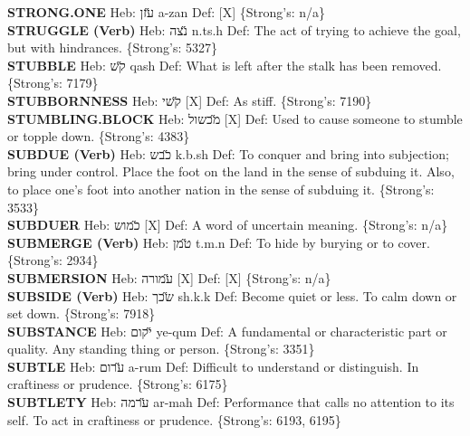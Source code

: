 {\textbf{STRONG.ONE} Heb: {\large\H עזן} a-zan Def: {[}X{]} \{Strong's: n/a\}\hfill{}\\

\textbf{STRUGGLE (Verb)} Heb: {\large\H נצה} n.ts.h Def: The act of trying to achieve the goal, but with hindrances. \{Strong's: 5327\}\hfill{}\\

\textbf{STUBBLE} Heb: {\large\H קש} qash Def: What is left after the stalk has been removed. \{Strong's: 7179\}\hfill{}\\

\textbf{STUBBORNNESS} Heb: {\large\H קשי} {[}X{]} Def: As stiff. \{Strong's: 7190\}\hfill{}\\

\textbf{STUMBLING.BLOCK} Heb: {\large\H מכשול} {[}X{]} Def: Used to cause someone to stumble or topple down. \{Strong's: 4383\}\hfill{}\\

\textbf{SUBDUE (Verb)} Heb: {\large\H כבש} k.b.sh Def: To conquer and bring into subjection; bring under control. Place the foot on the land in the sense of subduing it. Also, to place one’s foot into another nation in the sense of subduing it. \{Strong's: 3533\}\hfill{}\\

\textbf{SUBDUER} Heb: {\large\H כמוש} {[}X{]} Def: A word of uncertain meaning. \{Strong's: n/a\}\hfill{}\\

\textbf{SUBMERGE (Verb)} Heb: {\large\H טמן} t.m.n Def: To hide by burying or to cover. \{Strong's: 2934\}\hfill{}\\

\textbf{SUBMERSION} Heb: {\large\H עמורה} {[}X{]} Def: {[}X{]} \{Strong's: n/a\}\hfill{}\\

\textbf{SUBSIDE (Verb)} Heb: {\large\H שכך} sh.k.k Def: Become quiet or less. To calm down or set down. \{Strong's: 7918\}\hfill{}\\

\textbf{SUBSTANCE} Heb: {\large\H יקום} ye-qum Def: A fundamental or characteristic part or quality. Any standing thing or person. \{Strong's: 3351\}\hfill{}\\

\textbf{SUBTLE} Heb: {\large\H ערום} a-rum Def: Difficult to understand or distinguish. In craftiness or prudence. \{Strong's: 6175\}\hfill{}\\

\textbf{SUBTLETY} Heb: {\large\H ערמה} ar-mah Def: Performance that calls no attention to its self. To act in craftiness or prudence. \{Strong's: 6193, 6195\}\hfill{}\\

}
